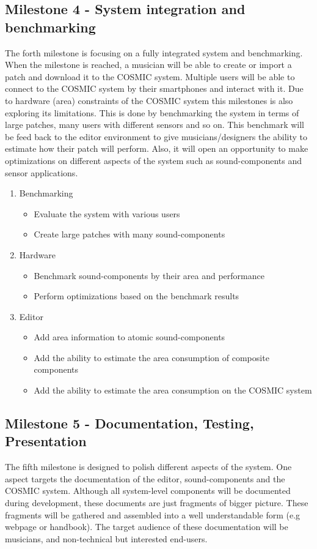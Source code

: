 \subsection{Milestone 4 - System integration and benchmarking}

The forth milestone is focusing on a fully integrated system and benchmarking. When the milestone is reached, a musician will be able to create or import a patch and download it to the \ac{COSMIC} system. Multiple users will be able to connect to the \ac{COSMIC} system by their smartphones and interact with it. Due to hardware (area) constraints of the \ac{COSMIC} system this milestones is also exploring its limitations. This is done by benchmarking the system in terms of large patches, many users with different sensors and so on. This benchmark will be feed back to the editor environment to give musicians/designers the ability to estimate how their patch will perform. Also, it will open an opportunity to make optimizations on different aspects of the system such as sound-components and sensor applications.

	\begin{enumerate}
		\item Benchmarking
			\begin{itemize}
				\item Evaluate the system with various users
				\item Create large patches with many sound-components
			\end{itemize}
		\item Hardware
			\begin{itemize}
				\item Benchmark sound-components by their area and performance
				\item Perform optimizations based on the benchmark results
			\end{itemize}
		\item Editor
			\begin{itemize}
				\item Add area information to atomic sound-components
				\item Add the ability to estimate the area consumption of composite components
				\item Add the ability to estimate the area consumption on the \ac{COSMIC} system
			\end{itemize}
	\end{enumerate}

\subsection{Milestone 5 - Documentation, Testing, Presentation}

The fifth milestone is designed to polish different aspects of the system. One aspect targets the documentation of the editor, sound-components and the \ac{COSMIC} system. Although all system-level components will be documented during development, these documents are just fragments of bigger picture. These fragments will be gathered and assembled into a well understandable form (e.g webpage or handbook). The target audience of these documentation will be musicians, and non-technical but interested end-users.  